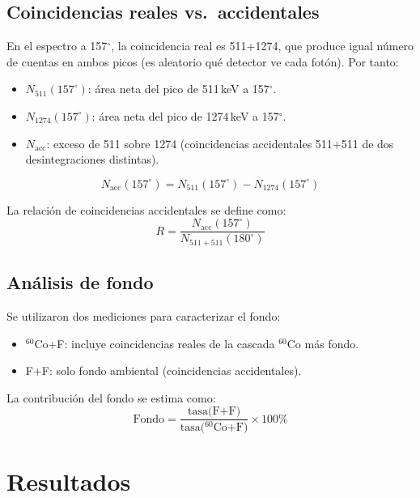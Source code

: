 \documentclass[12pt,a4paper]{article}
\begin{document}
\subsection{Coincidencias reales vs.\ accidentales}

En el espectro a 157$^\circ$, la coincidencia real es 511+1274, que produce igual n\'umero
de cuentas en ambos picos (es aleatorio qu\'e detector ve cada fot\'on). Por tanto:
\begin{itemize}
  \item $N_{511}(157^\circ)$: \'area neta del pico de 511\,keV a 157$^\circ$.
  \item $N_{1274}(157^\circ)$: \'area neta del pico de 1274\,keV a 157$^\circ$.
  \item $N_{\text{acc}}$: exceso de 511 sobre 1274 (coincidencias accidentales 511+511
        de dos desintegraciones distintas).
\end{itemize}
\begin{equation}
N_{\text{acc}}(157^\circ) = N_{511}(157^\circ) - N_{1274}(157^\circ)
\end{equation}

La relaci\'on de coincidencias accidentales se define como:
\begin{equation}
R = \frac{N_{\text{acc}}(157^\circ)}{N_{511+511}(180^\circ)}
\end{equation}

\subsection{An\'alisis de fondo}

Se utilizaron dos mediciones para caracterizar el fondo:
\begin{itemize}
  \item $^{60}$Co+F: incluye coincidencias reales de la cascada $^{60}$Co m\'as fondo.
  \item F+F: solo fondo ambiental (coincidencias accidentales).
\end{itemize}
La contribuci\'on del fondo se estima como:
\begin{equation}
\text{Fondo} = \frac{\text{tasa(F+F)}}{\text{tasa($^{60}$Co+F)}} \times 100\%
\end{equation}

\section{Resultados}
\end{document}
